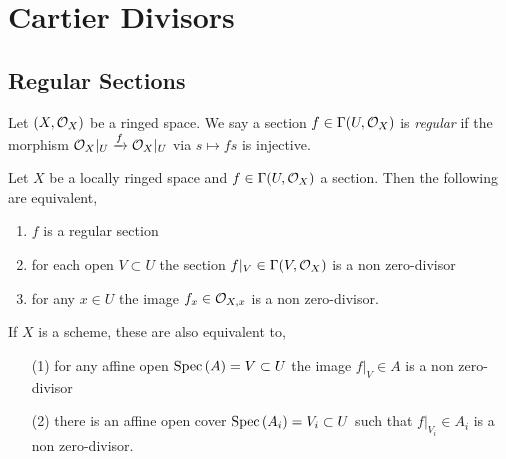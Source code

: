 \documentclass[12pt]{article}
\begin{document}
\section{Cartier Divisors}

\subsection{Regular Sections}

\begin{definition}
Let $(X, \mathcal{O}_{X})$ be a ringed space. We say a section $f \in \Gamma(U, \mathcal{O}_{X})$ is \textit{regular} if the morphism $\mathcal{O}_{X}|_U \xrightarrow{f} \mathcal{O}_{X}|_U$ via $s \mapsto f s$ is injective.
\end{definition}

\begin{lemma}
Let $X$ be a locally ringed space and $f \in \Gamma(U, \mathcal{O}_{X})$ a section. Then the following are equivalent,
\begin{enumerate}
\item $f$ is a regular section 
\item for each open $V \subset U$ the section $f|_V \in \Gamma(V, \mathcal{O}_{X})$ is a non zero-divisor
\item for any $x \in U$ the image $f_x \in \mathcal{O}_{X, x}$ is a non zero-divisor.
\end{enumerate}
If $X$ is a scheme, these are also equivalent to,
\begin{enumerate}
\item[(1)] for any affine open $\mathrm{Spec}\left( A \right) = V \subset U$ the image $f|_V \in A$ is a non zero-divisor
\item[(2)] there is an affine open cover $\mathrm{Spec}\left( A_i \right) = V_i \subset U$ such that $f|_{V_i} \in A_i$ is a non zero-divisor.
\end{enumerate}
\end{lemma}
\end{document}
